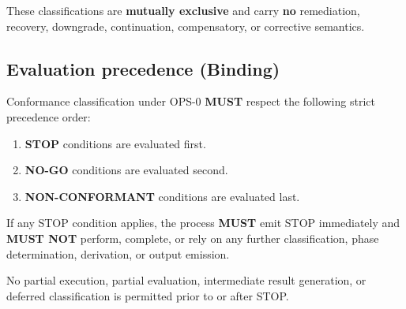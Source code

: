 These classifications are
\textbf{mutually exclusive}
and carry \textbf{no}
remediation, recovery,
downgrade, continuation,
compensatory, or corrective semantics.

\subsection{Evaluation precedence (Binding)}
Conformance classification under OPS-0
\textbf{MUST} respect the following
strict precedence order:

\begin{enumerate}
  \item \textbf{STOP} conditions are evaluated first.
  \item \textbf{NO-GO} conditions are evaluated second.
  \item \textbf{NON-CONFORMANT} conditions are evaluated last.
\end{enumerate}

If any STOP condition applies,
the process \textbf{MUST} emit STOP immediately
and \textbf{MUST NOT} perform, complete,
or rely on any further classification,
phase determination,
derivation, or output emission.

No partial execution,
partial evaluation,
intermediate result generation,
or deferred classification
is permitted prior to or after STOP.

